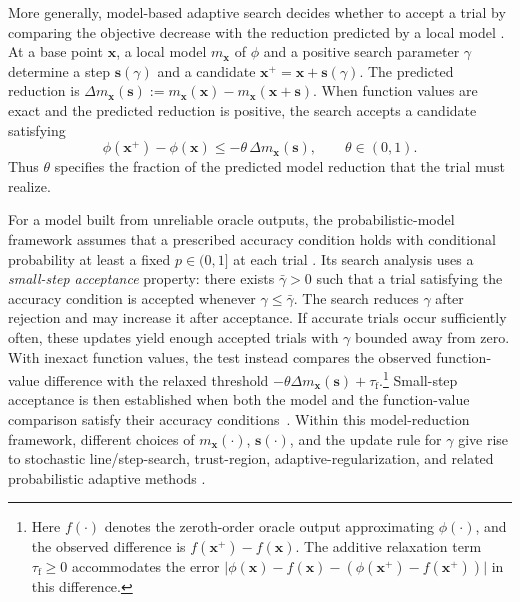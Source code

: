 \documentclass{article}
\begin{document}
More generally, model-based adaptive search decides whether to accept a trial by comparing the objective decrease with the reduction predicted by a local model 
\cite{Cartis2018,
scheinberg2025stochasticadaptiveoptimizationunreliable}.
At a base point $\bm{x}$, a local model $m_{\bm{x}}$ of $\phi$ and a positive search parameter $\gamma$ determine a step $\bm{s}(\gamma)$ and a candidate $\bm{x}^+=\bm{x}+\bm{s}(\gamma)$. The predicted reduction is $\Delta m_{\bm{x}}(\bm{s}):=m_{\bm{x}}(\bm{x})-m_{\bm{x}}(\bm{x}+\bm{s})$. When function values are exact and the predicted reduction is positive, the search accepts a candidate satisfying
\begin{equation}\label{eq:intro_model_reduction}
\phi(\bm{x}^+)-\phi(\bm{x})
\le
-\theta\,\Delta m_{\bm{x}}(\bm{s}),
\qquad
\theta\in(0,1).
\end{equation}
Thus $\theta$ specifies the fraction of the predicted model reduction that the trial must realize.

For a model built from unreliable oracle outputs, the probabilistic-model framework assumes that a prescribed accuracy condition holds with conditional probability at least a fixed $p\in(0,1]$ at each trial \cite{Cartis2018}. 
Its search analysis uses a \emph{small-step acceptance} property:
there exists \(\bar\gamma>0\) such that a trial satisfying
the accuracy condition is accepted whenever
\(\gamma\leq\bar\gamma\). The search reduces $\gamma$ after rejection and may increase it after acceptance. If accurate trials occur sufficiently often, these updates yield enough accepted trials with $\gamma$ bounded away from zero. With inexact function values, the test instead compares the observed function-value difference with the relaxed threshold $-\theta\Delta m_{\bm{x}}(\bm{s})+\tau_{\mathrm f}$.\footnote{Here $f(\cdot)$ denotes the zeroth-order oracle output approximating $\phi(\cdot)$, and the observed difference is $f(\bm{x}^+)-f(\bm{x})$. The additive relaxation term $\tau_{\mathrm f}\geq0$ accommodates the error $\bigl|\phi(\bm{x})-f(\bm{x})-(\phi(\bm{x}^+)-f(\bm{x}^+))\bigr|$ in this difference.} Small-step acceptance is then established when both the model and the function-value comparison satisfy their accuracy conditions~\cite{scheinberg2025stochasticadaptiveoptimizationunreliable}. Within this model-reduction framework, different choices of \(m_{\bm{x}}(\cdot)\), \(\bm{s}(\cdot)\), and the update rule for \(\gamma\) give rise to stochastic line/step-search, trust-region, adaptive-regularization, and related probabilistic adaptive methods
\cite{Cartis2018,gratton2018complexity,blanchet2019convergence,
bellavia2022adaptive,scheinberg2023cubic}. 
\end{document}
